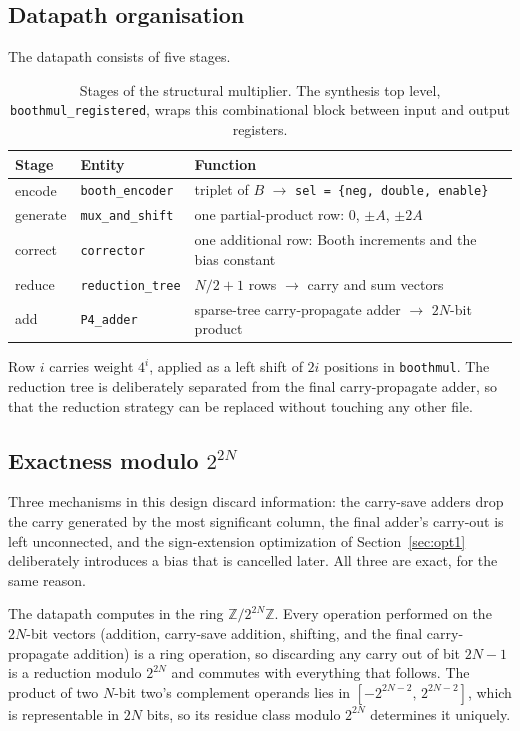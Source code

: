 \documentclass[11pt,a4paper]{article}
\begin{document}
\subsection{Datapath organisation}

The datapath consists of five stages.

\begin{table}[!ht]
\centering\small
\begin{tabular}{@{}lll@{}}
\toprule
\textbf{Stage} & \textbf{Entity} & \textbf{Function} \\
\midrule
encode    & \texttt{booth\_encoder}  & triplet of $B$ $\rightarrow$ \texttt{sel = \{neg, double, enable\}} \\
generate  & \texttt{mux\_and\_shift} & one partial-product row: $0$, $\pm A$, $\pm 2A$ \\
correct   & \texttt{corrector}       & one additional row: Booth increments and the bias constant \\
reduce    & \texttt{reduction\_tree} & $N/2{+}1$ rows $\rightarrow$ carry and sum vectors \\
add       & \texttt{P4\_adder}       & sparse-tree carry-propagate adder $\rightarrow$ $2N$-bit product \\
\bottomrule
\end{tabular}
\caption{Stages of the structural multiplier. The synthesis top level,
\texttt{boothmul\_registered}, wraps this combinational block between input and
output registers.}
\end{table}

Row $i$ carries weight $4^i$, applied as a left shift of $2i$ positions in
\texttt{boothmul}. The reduction tree is deliberately separated from the final
carry-propagate adder, so that the reduction strategy can be replaced without
touching any other file.

\subsection{Exactness modulo \texorpdfstring{$2^{2N}$}{2 to the power 2N}}
\label{sec:modular}

Three mechanisms in this design discard information: the carry-save adders drop
the carry generated by the most significant column, the final adder's carry-out
is left unconnected, and the sign-extension optimization of
Section~\ref{sec:opt1} deliberately introduces a bias that is cancelled later.
All three are exact, for the same reason.

The datapath computes in the ring $\mathbb{Z}/2^{2N}\mathbb{Z}$. Every
operation performed on the $2N$-bit vectors (addition, carry-save addition,
shifting, and the final carry-propagate addition) is a ring operation, so
discarding any carry out of bit $2N-1$ is a reduction modulo $2^{2N}$ and
commutes with everything that follows. The product of two $N$-bit two's
complement operands lies in $[-2^{2N-2},\,2^{2N-2}]$, which is representable in
$2N$ bits, so its residue class modulo $2^{2N}$ determines it uniquely.
\end{document}
